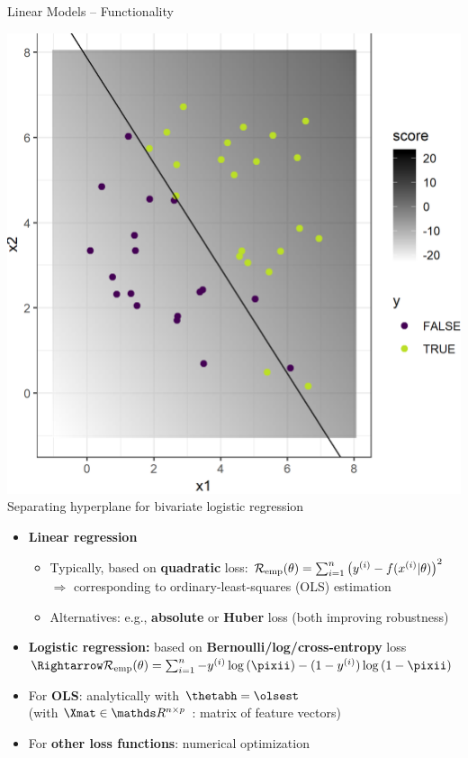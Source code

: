 \begin{vbframe}{Linear Models -- Functionality}
\begin{minipage}[b]{0.32\textwidth}
  \begin{center}
    \includegraphics[height=0.6\textwidth, keepaspectratio=true]{
    figure/logreg-2vars-data.png} \\
    \tiny{Separating hyperplane for bivariate logistic regression}
\end{center}
\end{minipage}

\framebreak


\begin{itemize}
  \item \textbf{Linear regression}
  \begin{itemize}
    
    \item Typically, based on \textbf{quadratic} loss: $\mathcal{R}_{\text{emp}}(\theta) = 
    \sum_{i=1}^n \left(y^{(i)} - f(x^{(i)} | \theta) \right)^2$ \\
    $\Rightarrow$ corresponding to ordinary-least-squares (OLS) estimation
    \item Alternatives: e.g., \textbf{absolute} or \textbf{Huber} loss (both 
    improving robustness)
  \end{itemize}
  \item \textbf{Logistic regression:} based on 
  \textbf{Bernoulli/log/cross-entropy} loss ~ 
  $\Rightarrow \risket = \sumin -\yi \log 
  \left(\pixii\right) - (1 - \yi) \log \left(1 - \pixii \right)$
\end{itemize}

\medskip

\begin{itemize}
  \item For \textbf{OLS}: analytically with 
  $\thetabh = \olsest$ \\
  (with $\Xmat \in \R^{n \times p}$ : matrix of feature vectors)
  \item For \textbf{other loss functions}: numerical optimization 
\end{itemize}


\end{vbframe}
